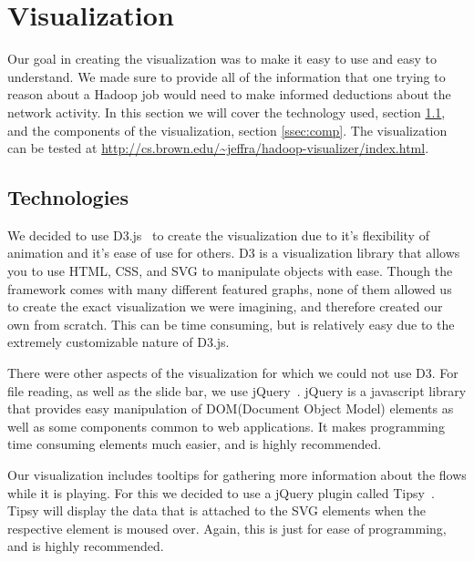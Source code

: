 \section{Visualization}
\label{sec:viz}
Our goal in creating the visualization was to make it easy to use and
easy to understand. We made sure to provide all of the information
that one trying to reason about a Hadoop job would need to make
informed deductions about the network activity. In this section we
will cover the technology used, section \ref{ssec:tech}, and the components of the
visualization, section \ref{ssec:comp}. The visualization can be
tested at \url{http://cs.brown.edu/~jeffra/hadoop-visualizer/index.html}.

\subsection{Technologies}
\label{ssec:tech}
We decided to use D3.js~\cite{D3.js} to create the visualization due to
it's flexibility of animation and it's ease of use for others. D3 is a
visualization library that allows you to use HTML, CSS, and SVG to
manipulate objects with ease. Though the framework comes with many
different featured graphs, none of them allowed us to create the exact
visualization we were imagining, and therefore created our own from
scratch. This can be time consuming, but is relatively easy due to the
extremely customizable nature of D3.js.

There were other aspects of the visualization for which we could not
use D3. For file reading, as well as the slide bar, we use
jQuery~\cite{jQuery}. jQuery is a javascript library that provides
easy manipulation of DOM(Document Object Model) elements as well as
some components common to web applications. It makes programming time
consuming elements much easier, and is highly recommended.

Our visualization includes tooltips for gathering more information
about the flows while it is playing. For this we decided to use a
jQuery plugin called Tipsy~\cite{tipsy}. Tipsy will display the data
that is attached to the SVG elements when the respective element is
moused over. Again, this is just for ease of programming, and is
highly recommended.


